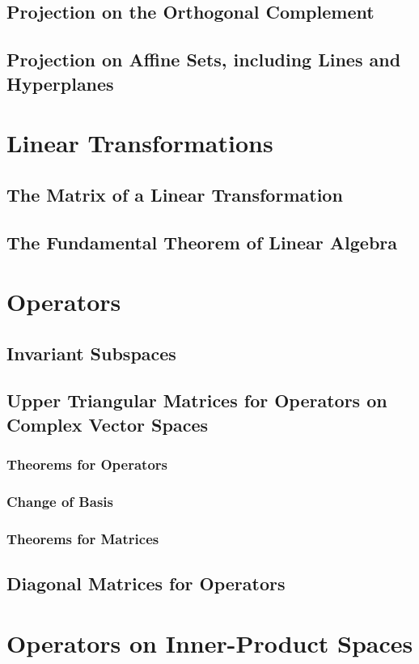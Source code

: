 \documentclass[10pt]{article}
\begin{document}
\subsection{Projection on the Orthogonal Complement}
\subsection{Projection on Affine Sets, including Lines and Hyperplanes}

\section{Linear Transformations}
\subsection{The Matrix of a Linear Transformation}
\subsection{The Fundamental Theorem of Linear Algebra}

\section{Operators}
\subsection{Invariant Subspaces}
\subsection{Upper Triangular Matrices for Operators on Complex Vector Spaces}
\subsubsection{Theorems for Operators}
\subsubsection{Change of Basis}
\subsubsection{Theorems for Matrices}
\subsection{Diagonal Matrices for Operators}

\section{Operators on Inner-Product Spaces}
\end{document}
